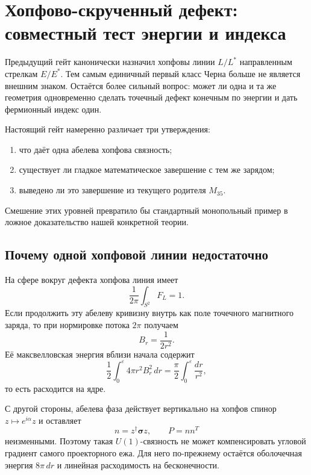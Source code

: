 \chapter{Хопфово-скрученный дефект: совместный тест энергии и индекса}

Предыдущий гейт канонически назначил хопфовы линии $L/L^*$ направленным
стрелкам $E/E^*$. Тем самым единичный первый класс Черна больше не является
внешним знаком. Остаётся более сильный вопрос: может ли одна и та же
геометрия одновременно сделать точечный дефект конечным по энергии и дать
фермионный индекс один.

Настоящий гейт намеренно различает три утверждения:
\begin{enumerate}
 \item что даёт одна абелева хопфова связность;
 \item существует ли гладкое математическое завершение с тем же зарядом;
 \item выведено ли это завершение из текущего родителя $M_{35}$.
\end{enumerate}
Смешение этих уровней превратило бы стандартный монопольный пример в
ложное доказательство нашей конкретной теории.

\section{Почему одной хопфовой линии недостаточно}

На сфере вокруг дефекта хопфова линия имеет
\begin{equation}
 \frac1{2\pi}\int_{S^2}F_L=1.
 \label{eq:v5-hopf-energy-index-c1}
\end{equation}
Если продолжить эту абелеву кривизну внутрь как поле точечного магнитного
заряда, то при нормировке потока $2\pi$ получаем
\begin{equation}
 B_r=\frac1{2r^2}.
\end{equation}
Её максвелловская энергия вблизи начала содержит
\begin{equation}
 \frac12\int_0^\varepsilon 4\pi r^2 B_r^2\,dr
 =\frac\pi2\int_0^\varepsilon\frac{dr}{r^2},
 \label{eq:v5-hopf-dirac-core-divergence}
\end{equation}
то есть расходится на ядре.

С другой стороны, абелева фаза действует вертикально на хопфов спинор
$z\mapsto e^{i\alpha}z$ и оставляет
\begin{equation}
 n=z^\dagger\boldsymbol\sigma z,
 \qquad
 P=nn^T
\end{equation}
неизменными. Поэтому такая $U(1)$-связность не может компенсировать
угловой градиент самого проекторного ежа. Для него по-прежнему остаётся
оболочечная энергия $8\pi\,dr$ и линейная расходимость на бесконечности.

